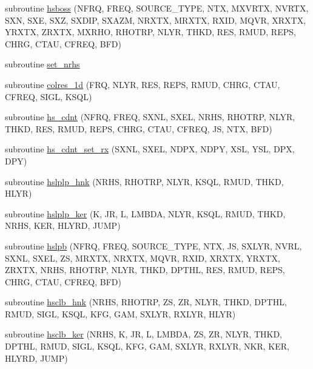 \begin{DoxyCompactItemize}
\item 
subroutine \hyperlink{Leroi__c_8f90_a940c66015c19ed9dab8214acf582b96c}{hsboss} (N\+F\+RQ, F\+R\+EQ, S\+O\+U\+R\+C\+E\+\_\+\+T\+Y\+PE, N\+TX, M\+X\+V\+R\+TX, N\+V\+R\+TX, S\+XN, S\+XE, S\+XZ, S\+X\+D\+IP, S\+X\+A\+ZM, N\+R\+X\+TX, M\+R\+X\+TX, R\+X\+ID, M\+Q\+VR, X\+R\+X\+TX, Y\+R\+X\+TX, Z\+R\+X\+TX, M\+X\+R\+HO, R\+H\+O\+T\+RP, N\+L\+YR, T\+H\+KD, R\+ES, R\+M\+UD, R\+E\+PS, C\+H\+RG, C\+T\+AU, C\+F\+R\+EQ, B\+FD)
\item 
subroutine \hyperlink{Leroi__c_8f90_a5e91ef1c525aed4231141372759cca43}{set\+\_\+nrhs}
\item 
subroutine \hyperlink{Leroi__c_8f90_a36d9dbba0b5eada45705f561c0035c54}{colres\+\_\+1d} (F\+RQ, N\+L\+YR, R\+ES, R\+E\+PS, R\+M\+UD, C\+H\+RG, C\+T\+AU, C\+F\+R\+EQ, S\+I\+GL, K\+S\+QL)
\item 
subroutine \hyperlink{Leroi__c_8f90_a94e83e050e27be19cb6d665d80c080bf}{hs\+\_\+cdnt} (N\+F\+RQ, F\+R\+EQ, S\+X\+NL, S\+X\+EL, N\+R\+HS, R\+H\+O\+T\+RP, N\+L\+YR, T\+H\+KD, R\+ES, R\+M\+UD, R\+E\+PS, C\+H\+RG, C\+T\+AU, C\+F\+R\+EQ, JS, N\+TX, B\+FD)
\item 
subroutine \hyperlink{Leroi__c_8f90_a052539a8cd1f0d9736453c9fb65581ca}{hs\+\_\+cdnt\+\_\+set\+\_\+rx} (S\+X\+NL, S\+X\+EL, N\+D\+PX, N\+D\+PY, X\+SL, Y\+SL, D\+PX, D\+PY)
\item 
subroutine \hyperlink{Leroi__c_8f90_a9418379c5cb3a81d71a2a66746f839da}{hslplp\+\_\+hnk} (N\+R\+HS, R\+H\+O\+T\+RP, N\+L\+YR, K\+S\+QL, R\+M\+UD, T\+H\+KD, H\+L\+YR)
\item 
subroutine \hyperlink{Leroi__c_8f90_a6a948de64e256424bee5e99021fa129c}{hslplp\+\_\+ker} (K, JR, L, L\+M\+B\+DA, N\+L\+YR, K\+S\+QL, R\+M\+UD, T\+H\+KD, N\+R\+HS, K\+ER, H\+L\+Y\+RD, J\+U\+MP)
\item 
subroutine \hyperlink{Leroi__c_8f90_a247cf958ed9d5aa90d05eee29e6a9582}{hslpb} (N\+F\+RQ, F\+R\+EQ, S\+O\+U\+R\+C\+E\+\_\+\+T\+Y\+PE, N\+TX, JS, S\+X\+L\+YR, N\+V\+RL, S\+X\+NL, S\+X\+EL, ZS, M\+R\+X\+TX, N\+R\+X\+TX, M\+Q\+VR, R\+X\+ID, X\+R\+X\+TX, Y\+R\+X\+TX, Z\+R\+X\+TX, N\+R\+HS, R\+H\+O\+T\+RP, N\+L\+YR, T\+H\+KD, D\+P\+T\+HL, R\+ES, R\+M\+UD, R\+E\+PS, C\+H\+RG, C\+T\+AU, C\+F\+R\+EQ, B\+FD)
\item 
subroutine \hyperlink{Leroi__c_8f90_ae6841c5477812a4e7255f7ed2da9a7c8}{hsclb\+\_\+hnk} (N\+R\+HS, R\+H\+O\+T\+RP, ZS, ZR, N\+L\+YR, T\+H\+KD, D\+P\+T\+HL, R\+M\+UD, S\+I\+GL, K\+S\+QL, K\+FG, G\+AM, S\+X\+L\+YR, R\+X\+L\+YR, H\+L\+YR)
\item 
subroutine \hyperlink{Leroi__c_8f90_ab053f1c7997499ed6fca932a2f8cbecb}{hsclb\+\_\+ker} (N\+R\+HS, K, JR, L, L\+M\+B\+DA, ZS, ZR, N\+L\+YR, T\+H\+KD, D\+P\+T\+HL, R\+M\+UD, S\+I\+GL, K\+S\+QL, K\+FG, G\+AM, S\+X\+L\+YR, R\+X\+L\+YR, N\+KR, K\+ER, H\+L\+Y\+RD, J\+U\+MP)

\end{DoxyCompactItemize}
